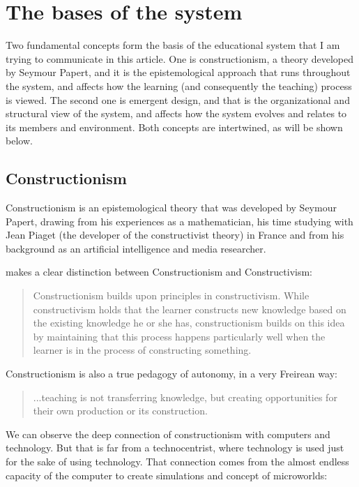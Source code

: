 \section{The bases of the system}
Two fundamental concepts form the basis of the educational system that I am
trying to communicate in this article. One is constructionism, a theory
developed by Seymour Papert, and it is the epistemological approach that runs
throughout the system, and affects how the learning (and consequently the
teaching) process is viewed.  The second one is emergent design, and that is the
organizational and structural view of the system, and affects how the system
evolves and relates to its members and environment. Both concepts are
intertwined, as will be shown below. 

\subsection{Constructionism}
Constructionism is an epistemological theory that was developed by Seymour
Papert, drawing from his experiences as a mathematician, his time studying with
Jean Piaget (the developer of the constructivist theory) in France and from his
background as an artificial intelligence and media researcher.

\cite{education:cavallo_building_knowledge} makes a clear distinction between Constructionism and
Constructivism:

\begin{quote}
    Constructionism builds upon principles in constructivism. While constructivism
    holds that the learner constructs new knowledge based on the existing knowledge
    he or she has, constructionism builds on this idea by maintaining that this
    process happens particularly well when the learner is in the process of
    constructing something.                   
\end{quote}

Constructionism is also a true pedagogy of autonomy, in a very Freirean way:
\begin{quote}
    ...teaching is not transferring knowledge, but creating opportunities for their own
    production or its construction.
\cite{education:paulo_freire__pedagogia_da_autonomia}
\end{quote}

We can observe the deep connection of constructionism with computers and
technology. But that is far from a technocentrist, where technology is used just
for the sake of using technology. That connection comes from the almost endless
capacity of the computer to create simulations and concept of microworlds:

